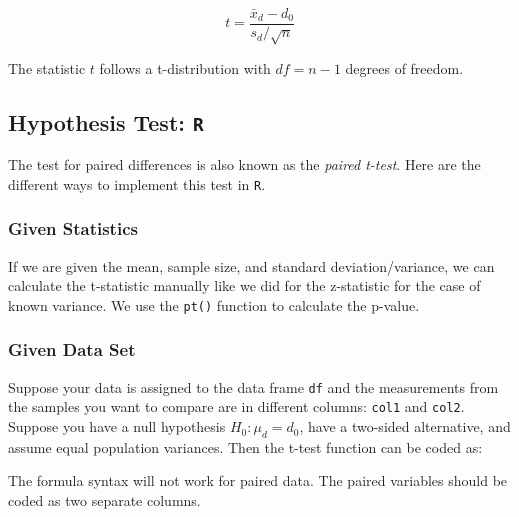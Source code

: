 \documentclass[
  letterpaper,
  DIV=11,
  numbers=noendperiod]{scrartcl}
\newenvironment{Shaded}{\begin{snugshade}}{\end{snugshade}}
\newcommand{\AttributeTok}[1]{\textcolor[rgb]{0.40,0.45,0.13}{#1}}
\newcommand{\ConstantTok}[1]{\textcolor[rgb]{0.56,0.35,0.01}{#1}}
\newcommand{\FunctionTok}[1]{\textcolor[rgb]{0.28,0.35,0.67}{#1}}
\newcommand{\NormalTok}[1]{\textcolor[rgb]{0.00,0.23,0.31}{#1}}
\newcommand{\SpecialCharTok}[1]{\textcolor[rgb]{0.37,0.37,0.37}{#1}}
\newcommand{\StringTok}[1]{\textcolor[rgb]{0.13,0.47,0.30}{#1}}
\begin{document}
\[
t = \frac{\bar{x}_d-d_0}{s_d/\sqrt{n}}
\]

The statistic \(t\) follows a t-distribution with \(df=n-1\) degrees of
freedom.

\subsection{\texorpdfstring{Hypothesis Test:
\texttt{R}}{Hypothesis Test: R}}\label{hypothesis-test-r-1}

The test for paired differences is also known as the \emph{paired
t-test}. Here are the different ways to implement this test in
\texttt{R}.

\subsubsection{Given Statistics}

If we are given the mean, sample size, and standard deviation/variance,
we can calculate the t-statistic manually like we did for the
z-statistic for the case of known variance. We use the \texttt{pt()}
function to calculate the p-value.

\subsubsection{Given Data Set}

Suppose your data is assigned to the data frame \texttt{df} and the
measurements from the samples you want to compare are in different
columns: \texttt{col1} and \texttt{col2}. Suppose you have a null
hypothesis \(H_0: \mu_d=d_0\), have a two-sided alternative, and assume
equal population variances. Then the t-test function can be coded as:

\begin{Shaded}
\end{Shaded}

\begin{tcolorbox}[enhanced jigsaw, bottomtitle=1mm, colback=white, opacityback=0, leftrule=.75mm, opacitybacktitle=0.6, coltitle=black, left=2mm, colframe=quarto-callout-warning-color-frame, toptitle=1mm, colbacktitle=quarto-callout-warning-color!10!white, titlerule=0mm, title=\textcolor{quarto-callout-warning-color}{\faExclamationTriangle}\hspace{0.5em}{Warning}, arc=.35mm, rightrule=.15mm, breakable, bottomrule=.15mm, toprule=.15mm]

The formula syntax will not work for paired data. The paired variables
should be coded as two separate columns.

\end{tcolorbox}
\end{document}
